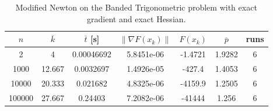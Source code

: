 \begin{table}
\caption{Modified Newton on the Banded Trigonometric problem with exact gradient and exact Hessian.}
\label{tab:mn_trig_exact}
\begin{tabular}{ccccccc}
\toprule
$n$ & $\overline{k}$ & $\overline{t}$ [s] & $\|\nabla F(x_k)\|$ & $F(x_k)$ & $\overline{p}$ & runs \\
\midrule
2 & 4 & 0.00046692 & 5.8451e-06 & -1.4721 & 1.9282 & 6 \\
1000 & 12.667 & 0.0032697 & 1.4926e-05 & -427.4 & 1.4053 & 6 \\
10000 & 20.333 & 0.021682 & 4.8325e-06 & -4159.9 & 1.2505 & 6 \\
100000 & 27.667 & 0.24403 & 7.2082e-06 & -41444 & 1.256 & 6 \\
\bottomrule
\end{tabular}
\end{table}
